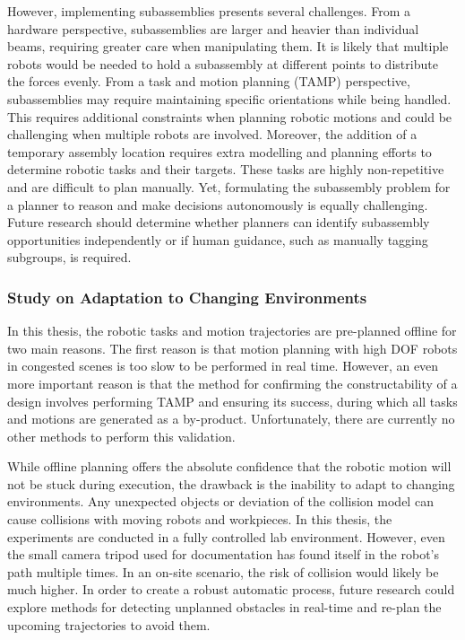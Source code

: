 \documentclass[11pt]{book}
\begin{document}
However, implementing subassemblies presents several challenges. From a hardware perspective, subassemblies are larger and heavier than individual beams, requiring greater care when manipulating them. It is likely that multiple robots would be needed to hold a subassembly at different points to distribute the forces evenly. From a task and motion planning (TAMP) perspective, subassemblies may require maintaining specific orientations while being handled. This requires additional constraints when planning robotic motions and could be challenging when multiple robots are involved. Moreover, the addition of a temporary assembly location requires extra modelling and planning efforts to determine robotic tasks and their targets. These tasks are highly non-repetitive and are difficult to plan manually. Yet, formulating the subassembly problem for a planner to reason and make decisions autonomously is equally challenging. Future research should determine whether planners can identify subassembly opportunities independently or if human guidance, such as manually tagging subgroups, is required.

\subsubsection{Study on Adaptation to Changing Environments}

In this thesis, the robotic tasks and motion trajectories are pre-planned offline for two main reasons. The first reason is that motion planning with high DOF robots in congested scenes is too slow to be performed in real time. However, an even more important reason is that the method for confirming the constructability of a design involves performing TAMP and ensuring its success, during which all tasks and motions are generated as a by-product. Unfortunately, there are currently no other methods to perform this validation. 

While offline planning offers the absolute confidence that the robotic motion will not be stuck during execution, the drawback is the inability to adapt to changing environments. Any unexpected objects or deviation of the collision model can cause collisions with moving robots and workpieces. In this thesis, the experiments are conducted in a fully controlled lab environment. However, even the small camera tripod used for documentation has found itself in the robot's path multiple times. In an on-site scenario, the risk of collision would likely be much higher. In order to create a robust automatic process, future research could explore methods for detecting unplanned obstacles in real-time and re-plan the upcoming trajectories to avoid them.
\end{document}
